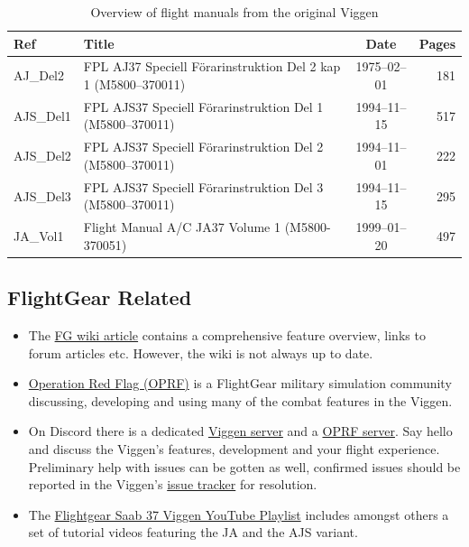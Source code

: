 \begin{table}[!th]
\begin{tabular}{|l|l|c|r|}
\hline
Ref & Title & Date & Pages \\
\hline
AJ\_Del2 & FPL AJ37 Speciell Förarinstruktion Del 2 kap 1 (M5800--370011) & 1975--02--01 & 181 \\
AJS\_Del1 & FPL AJS37 Speciell Förarinstruktion Del 1 (M5800--370011) & 1994--11--15 & 517 \\
AJS\_Del2 & FPL AJS37 Speciell Förarinstruktion Del 2 (M5800--370011) & 1994--11--01 & 222 \\
AJS\_Del3 & FPL AJS37 Speciell Förarinstruktion Del 3 (M5800--370011) & 1994--11--15 & 295 \\
JA\_Vol1 & Flight Manual A/C JA37 Volume 1 (M5800-370051) & 1999--01--20 & 497 \\
\hline
\end{tabular}
\caption{Overview of flight manuals from the original Viggen}
\end{table}

\subsection{FlightGear Related}
\begin{itemize}
\item The \href{http://wiki.flightgear.org/Saab_37_Viggen}{FG wiki article} contains a comprehensive feature overview, links to forum articles etc. However, the wiki is not always up to date.
\item \href{http://opredflag.com/}{Operation Red Flag (OPRF)} is a FlightGear military simulation community discussing, developing and using many of the combat features in the Viggen.
\item On Discord there is a dedicated \href{https://discord.gg/jc5pSM5}{Viggen server} and a \href{https://discord.gg/SmGFnJN}{OPRF server}. Say hello and discuss the Viggen's features, development and your flight experience. Preliminary help with issues can be gotten as well, confirmed issues should be reported in the Viggen's \href{https://github.com/NikolaiVChr/flightgear-saab-ja-37-viggen/issues}{issue tracker} for resolution.
\item The \href{https://www.youtube.com/playlist?list=PLogi97V-ki0GfCLqimTtIq9RIVcm-GRFE}{Flightgear Saab 37 Viggen YouTube Playlist} includes amongst others a set of tutorial videos featuring the JA and the AJS variant.
\end{itemize}

